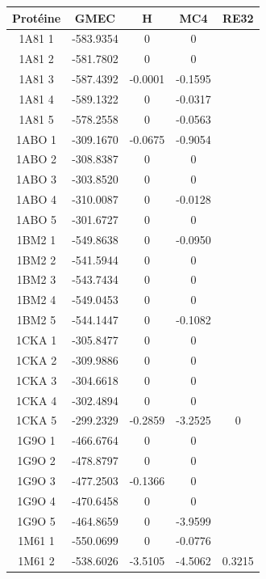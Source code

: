 \documentclass[a4paper,12pt]{article}
\begin{document}
    \begin{table}[h]
      \centering

      \begin{tabular}{|c|c|c|c|c|}


        \hline
        Protéine & GMEC & H & MC4 & RE32 \\
        \hline
        1A81 1 & -583.9354 & 0 & 0 & \\
        1A81 2 & -581.7802 & 0 & 0 & \\
        1A81 3 & -587.4392 & -0.0001 & -0.1595 & \\
        1A81 4 & -589.1322 & 0 & -0.0317 & \\
        1A81 5 & -578.2558 & 0 & -0.0563 & \\
        1ABO 1 & -309.1670 & -0.0675 & -0.9054 & \\
        1ABO 2 & -308.8387 & 0 & 0 & \\
        1ABO 3 & -303.8520 & 0 & 0 & \\
        1ABO 4 & -310.0087 & 0 & -0.0128 & \\
        1ABO 5 & -301.6727 & 0 & 0 & \\
        1BM2 1 & -549.8638 & 0 & -0.0950 & \\
        1BM2 2 & -541.5944 & 0 & 0 & \\
        1BM2 3 & -543.7434 & 0 & 0 & \\
        1BM2 4 & -549.0453 & 0 & 0 & \\
        1BM2 5 & -544.1447 & 0 & -0.1082 & \\
        1CKA 1 & -305.8477 & 0 & 0 & \\
        1CKA 2 & -309.9886 & 0 & 0 & \\
        1CKA 3 & -304.6618 & 0 & 0 & \\
        1CKA 4 & -302.4894 & 0 & 0 & \\
        1CKA 5 & -299.2329 & -0.2859 & -3.2525 & 0 \\
        1G9O 1 & -466.6764 & 0 & 0 & \\
        1G9O 2 & -478.8797 & 0 & 0 & \\
        1G9O 3 & -477.2503 & -0.1366 & 0 & \\
        1G9O 4 & -470.6458 & 0 & 0 & \\
        1G9O 5 & -464.8659 & 0 & -3.9599 & \\
        1M61 1 & -550.0699 & 0 & -0.0776 & \\
        1M61 2 & -538.6026 & -3.5105 & -4.5062 & 0.3215 \\

\end{tabular}
\end{table}
\end{document}
